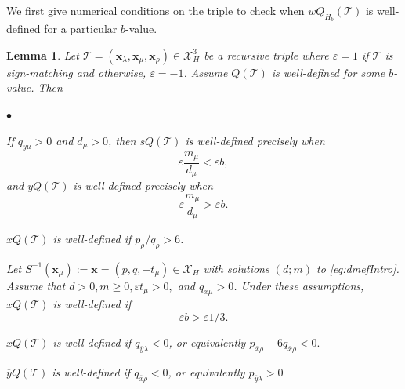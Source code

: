 \documentclass[11pt, reqno]{amsart}
\newtheorem{lemma}[thm]{Lemma}
\theoremstyle{remark}
\numberwithin{equation}{subsection}
\numberwithin{figure}{section}
\theoremstyle{customremark}
\newcommand{\Tt}{\mathcal{T}}
\newenvironment{itemlist}
   { \begin{list} {$\bullet$}
         { \setlength{\topsep}{.5ex}  \setlength{\itemsep}{.5ex} \setlength{\leftmargin}{2.5ex} } }
   { \end{list} }
\newcommand{\ovx}{{\ov{x}}}
\newcommand{\ovy}{{\ov{y}}}
\newcommand{\ov}{\overline}
\newcommand{\la}{{\lambda}}
\newcommand{\eps}{\varepsilon}
\newcommand{\X}{\mathcal{X}}
\begin{document}
We first give numerical conditions on the triple to check when $wQ_{H_b}(\Tt)$ is well-defined for a particular $b$-value. 
\begin{lemma}\label{lem:definedH}
    Let $\Tt=(\bm{x}_\la,\bm{x}_\mu,\bm{x}_\rho)\in \X_H^3$ be a recursive triple where $\eps=1$ if $\Tt$ is sign-matching and otherwise, $\eps=-1$. Assume $Q(\Tt)$ is well-defined for some $b$-value. Then
    \begin{itemlist}
        \item[{(i)}] 
        If \(q_{y\mu}>0\) and $d_\mu>0$, then \(sQ(\Tt)\) is well-defined precisely when
\[
        \eps\frac{m_\mu}{d_\mu}<\eps b,
\]
and \(yQ(\Tt)\) is well-defined precisely when
\[
        \eps\frac{m_\mu}{d_\mu}>\eps b.
\]

     
        \item[{(ii)}] $xQ(\Tt)$ is well-defined if $p_\rho/q_\rho>6$. 
        \item[{(iii)}] Let $S^{-1}(\bm{x}_\mu):=\bm{x}=(p,q,-t_\mu) \in\X_H$ with solutions $(d;m)$ to \eqref{eq:dmefIntro}. Assume that $d>0,m\geq 0, \eps t_\mu>0,$ and $q_{x\mu}>0$. Under these assumptions, $xQ(\Tt)$ is well-defined if
        \[ \eps b>\eps 1/3.\] 
  \item[{(iv)}] $\ovx Q(\Tt)$ is well-defined if $q_{\ovy\la}<0$, or equivalently $p_{\ov{x}\rho}-6q_{\ov{x}\rho}<0.$
        \item[{(v)}] $\ovy Q(\Tt)$ is well-defined if $q_{\ovx\rho}<0$, or equivalently $p_{\ovy\la}>0$
    \end{itemlist}
\end{lemma}
\end{document}
